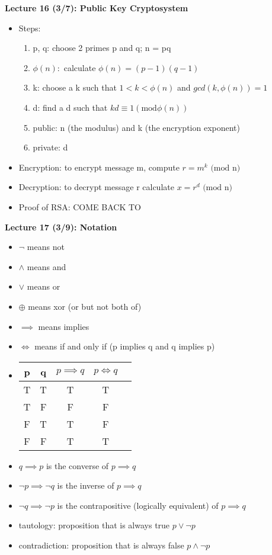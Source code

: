 \documentclass[twocolumn]{article}
\begin{document}
\textbf{Lecture 16 (3/7): Public Key Cryptosystem}
\begin{itemize}
    \item Steps:
    \begin{enumerate}
        \item p, q: choose 2 primes p and q; n = pq
        \item $\phi(n):$ calculate $\phi(n)=(p-1)(q-1)$
        \item k: choose a k such that $1<k<\phi(n)$ and $gcd(k, \phi(n))=1$
        \item d: find a d such that $kd \equiv 1 (\text{mod}\phi(n))$
        \item public: n (the modulus) and k (the encryption exponent)
        \item private: d
    \end{enumerate}
    \item Encryption: to encrypt message m, compute $r = m^k \text{ (mod n)}$
    \item Decryption: to decrypt message r calculate $x = r^d \text{ (mod n)}$
    \item Proof of RSA: COME BACK TO
\end{itemize}

\textbf{Lecture 17 (3/9): Notation}
\begin{itemize}
    \item $\lnot$ means not
    \item $\wedge$ means and
    \item $\vee$ means or
    \item $\oplus$ means xor (or but not both of)
    \item $\implies$ means implies
    \item $\iff$ means if and only if (p implies q and q implies p)
    \item
        \begin{tabular}{ |c|c|c|c|c| }
            \hline
            p & q & $p \implies q$ & $p \iff q$ \\
            \hline
            T & T & T & T\\ 
            T & F & F & F\\ 
            F & T & T & F\\ 
            F & F & T & T\\ 
            \hline
        \end{tabular}
    \item $q \implies p$ is the converse of $p \implies q$
    \item $\lnot p \implies \lnot q$ is the inverse of $p \implies q$
    \item $\lnot q \implies \lnot p$ is the contrapositive (logically equivalent) of $p \implies q$
    \item tautology: proposition that is always true $p \vee \lnot p$
    \item contradiction: proposition that is always false $p \wedge \lnot p$
\end{itemize}
\end{document}
